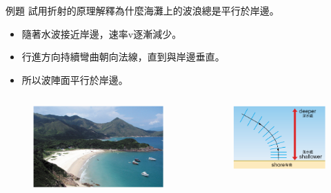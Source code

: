 \documentclass[13pt]{beamer}
\begin{document}
\begin{frame}[t]{例題}
    試用折射的原理解釋為什麼海灘上的波浪總是平行於岸邊。\medskip
    \begin{itemize}
        \item 隨著水波接近岸邊，速率v逐漸減少。
        \item 行進方向持續彎曲朝向法線，直到與岸邊垂直。
        \item 所以波陣面平行於岸邊。
    \end{itemize}
    \bigskip
    \begin{columns}
        \begin{figure}
            \centering
            \includegraphics[width=\linewidth]{images/Picture1.png}


        \end{figure}
        \begin{figure}
            \centering
            \includegraphics[width=1\linewidth]{images/Picture2.png}


        \end{figure}
    \end{columns}
\end{frame}
\end{document}
